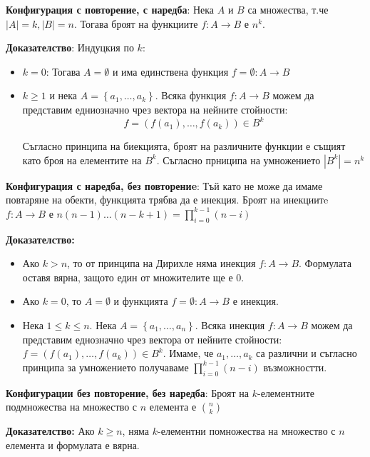 \documentclass{article}
\renewcommand{\\}{\newline}
\newcommand{\doc}{\textbf{Доказателство: }}
\begin{document}
      \textbf{Конфигурация с повторение, с наредба}: Нека \(A\) и \(B\) са множества, т.че \(\left|A\right|=k, \left|B\right|=n\). Тогава броят на функциите \(f: A \to B\) е \(n^{k}\). 

      \textbf{Доказателство}: Индуцкия по \(k\):
      \begin{itemize}
          \item \(k=0\): Тогава \(A=\emptyset\) и има единствена функция \(f=\emptyset: A \to B\) 
          \item \(k \geq 1\) и нека \(A=\left\{a_{1}, \dots, a_{k}\right\}\). Всяка функция \(f: A \to B\) можем да представим едниозначно чрез вектора на нейните стойности: \[ f = \left(f(a_{1}),\dots, f(a_{k})\right) \in B^{k} \]

        Съгласно принципа на биекцията, броят на различните функции е същият като броя на елементите на \(B^{k}\). Съгласно прниципа на умножението \(\left|B^{k}\right| = n^{k}\)   
        
      \end{itemize}

      \textbf{Конфигурация с наредба, без повторениe}: Тъй като не може да имаме повтаряне на обекти, функцията трябва да е инекция. Броят на инекциитe \(f: A \to B\) е \(n(n-1)\dots(n-k+1) = \prod_{i=0}^{k-1}(n-i)\)    

      \doc \begin{itemize}
          \item Ако \(k > n\), то от принципа на Дирихле няма инекция \(f: A \to B\). Формулата оставя вярна, защото един от множителите ще е 0. 
          \item Ако \(k=0\), то \(A=\emptyset\) и функцията \(f=\emptyset: A \to B\) е инекция. 
          \item Нека \(1 \leq k \leq n\). Нека \(A = \left\{a_{1},\dots,a_n\right\}\). Всяка инекция \(f: A \to B\) можем да представим еднозначно чрез вектора от нейните стойности: \(f=\left(f(a_{1}), \dots, f(a_{k})\right)\in B^{k}\). Имаме, че \(a_{1},\dots, a_{k}\) са различни и съгласно принципа за умножението получаваме \(\prod_{i=0}^{k-1}(n-i)\) възможностти.      
      \end{itemize}

      \textbf{Конфигурации без повторение, без наредба}: Броят на \(k\)-елементните подмножества на множество с \(n\) елемента е \(\binom{n}{k}\)

      \doc Ако \(k \geq n\), няма \(k\)-елементни помножества на множество с \(n\)   елемента и формулата е вярна. 
\end{document}
